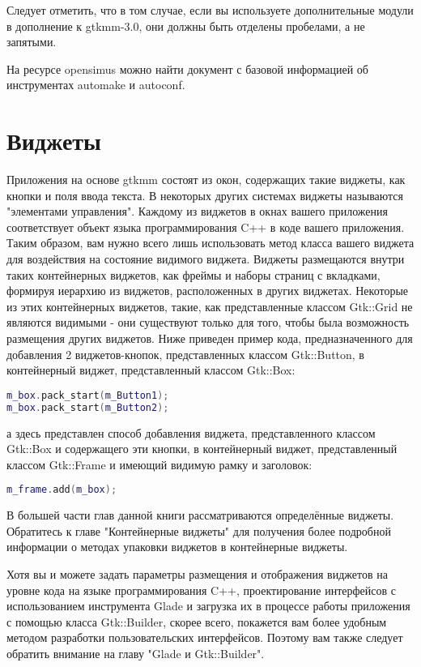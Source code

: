 Следует отметить, что в том случае, если вы используете дополнительные модули в дополнение к gtkmm-3.0, они должны быть отделены пробелами, а не запятыми.

На ресурсе opensimus можно найти документ с базовой информацией об инструментах automake и autoconf. 

\section{Виджеты}
 Приложения на основе gtkmm состоят из окон, содержащих такие виджеты, как кнопки и поля ввода текста. В некоторых других системах виджеты называются "элементами управления". Каждому из виджетов в окнах вашего приложения соответствует объект языка программирования C++ в коде вашего приложения. Таким образом, вам нужно всего лишь использовать метод класса вашего виджета для воздействия на состояние видимого виджета.
Виджеты размещаются внутри таких контейнерных виджетов, как фреймы и наборы страниц с вкладками, формируя иерархию из виджетов, расположенных в других виджетах. Некоторые из этих контейнерных виджетов, такие, как представленные классом Gtk::Grid не являются видимыми - они существуют только для того, чтобы была возможность размещения других виджетов. Ниже приведен пример кода, предназначенного для добавления 2 виджетов-кнопок, представленных классом Gtk::Button, в контейнерный виджет, представленный классом Gtk::Box:
\begin{lstlisting}[language=C++]
m_box.pack_start(m_Button1);
m_box.pack_start(m_Button2);
\end{lstlisting}
а здесь представлен способ добавления виджета, представленного классом Gtk::Box и содержащего эти кнопки, в контейнерный виджет, представленный классом Gtk::Frame и имеющий видимую рамку и заголовок:
\begin{lstlisting}[language=C++]
m_frame.add(m_box);
\end{lstlisting}


В большей части глав данной книги рассматриваются определённые виджеты. Обратитесь к главе "Контейнерные виджеты" для получения более подробной информации о методах упаковки виджетов в контейнерные виджеты.

Хотя вы и можете задать параметры размещения и отображения виджетов на уровне кода на языке программирования C++, проектирование интерфейсов с использованием инструмента Glade и загрузка их в процессе работы приложения с помощью класса Gtk::Builder, скорее всего, покажется вам более удобным методом разработки пользовательских интерфейсов. Поэтому вам также следует обратить внимание на главу "Glade и Gtk::Builder".

